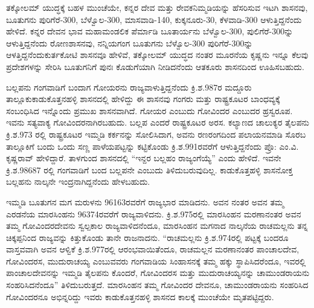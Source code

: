 ತಕ್ಕೋಲಮ್ ಯುದ್ಧಕ್ಕೆ ಬಹಳ ಮುಂಚೆಯೇ, ಕನ್ನರ ದೇವ ಮತ್ತು ರೇವಕನಿಮ್ಮಡಿಯನ್ನು ಹೆಸರಿಸುವ ಇಟಗಿ ಶಾಸನವು, ಬೂತುಗನು ಪುರಿಗೆರೆ-300, ಬೆಳ್ವೊಲ-300, ಮಾಸವಾಡಿ-140, ಕುಕ್ಕನೂರು-30, ಕೆಳವಾಡಿ-300 ಆಳುತ್ತಿದ್ದನೆಂದು ಹೇಳಿದೆ. ಕನ್ನರ ದೇವನ ಭಾವ ಮಹಾಮಂಡಲಿಕ ಪೆರ್ಮಾಡಿ ಬೂತಾರ್ಯನು ಬೆಳ್ವೊಲ-300, ಪುಲಿಗೆರೆ-300ನ್ನು ಆಳುತ್ತಿದ್ದನೆಂದು ರೋಣಶಾಸನವು, ನನ್ನಿಯಗಂಗ ಬೂತುಗನು ಬೆಳ್ವೊಲ-300 ಪುರಿಗೆರೆ-300ನ್ನು ಆಳತ್ತಿದ್ದನೆಂದು\break ಕುರ್ತಕೋಟಿ ಶಾಸನವೂ ಹೇಳಿವೆ, ತಕ್ಕೋಲಮ್ ಯುದ್ಧದ ನಂತರ ಮೂರನೆಯ ಕೃಷ್ಣನು ಇನ್ನೂ ಕೆಲವು ಪ್ರದೇಶಗಳನ್ನು ಸೇರಿಸಿ ಬೂತುಗನಿಗೆ ಪುನಃ ಕೊಡುಗೆಯಾಗಿ ನೀಡಿದನೆಂದು ಆತಕೂರು ಶಾಸನದಿಂದ ಊಹಿಸಬಹುದು.

ಬಲ್ಲಪನು ಗಂಗವಾಡಿಗೆ ಬಂದಾಗ ಗೋಯರನು ರಾಜ್ಯವಾಳುತ್ತಿದ್ದನೆಂದು ಕ್ರಿ.ಶ.987ರ ಮದ್ದೂರು ತಾಲ್ಲೂಕು\break ಕಾಡುಕೊತ್ತನಹಳ್ಳಿ ಶಾಸನದಲ್ಲಿ ಹೇಳಿದ್ದು ಈ ಶಾಸನವು ಗಂಗರು ಮತ್ತು ರಾಷ್ಟ್ರಕೂಟರ ಬಾಂಧವ್ಯಕ್ಕೆ ಸಂಬಂಧಿಸಿದ ಇನ್ನೊಂದು ಪ್ರಮುಖ ಶಾಸನವಾಗಿದೆ. ಗೋಯರ ಎಂಬುದು ಗೋವಿಂದರ ಎಂಬುದರ ಹ್ರಸ್ವರೂಪ. ಇವನು ಸತ್ಯವಾಕ್ಯ ಗೋವಿಂದರನಾಗಿರಬಹುದು. ಬಲ್ಲಪ ಎಂದರೆ ರಾಷ್ಟ್ರಕೂಟರ ಅರಸ. ಕಲ್ಯಾಣದ ಚಾಲುಕ್ಯರ ತೈಲಪನು ಕ್ರಿ.ಶ.973 ರಲ್ಲಿ ರಾಷ್ಟ್ರಕೂಟರ ಇಮ್ಮಡಿ ಕರ್ಕನನ್ನು ಸೋಲಿಸಿದಾಗ, ಅವನು ರಣರಂಗದಿಂದ ಪಲಾಯನಮಾಡಿ ಸೊರಬ ತಾಲ್ಲೂಕಿಗೆ ಬಂದು ಒಂದು ಸಣ್ಣ ಪಾಳೆಯಪಟ್ಟನ್ನು ಕಟ್ಟಿಕೊಂಡು ಕ್ರಿ.ಶ.991ರವರೆಗೆ ಆಳುತ್ತಿದ್ದನೆಂದು ಪ್ರೊ: ಎಂ.ವಿ. ಕೃಷ್ಣರಾವ್​ ಹೇಳಿದ್ದಾರೆ. ತಾಳಗುಂದ ಶಾಸನದಲ್ಲಿ “ಇನ್ದರ ಬಲ್ಲಹಂ ರಾಜ್ಯಂಗೆಯ್ಯೆ” ಎಂದು ಹೇಳಿದೆ. ಇವನೇ ಕ್ರಿ.ಶ.986\enginline{-}87 ರಲ್ಲಿ ಗಂಗವಾಡಿಗೆ ಬಂದ ಬಲ್ಲಪನೇ ಎಂಬುದು ತಿಳಿದುಬರುವುದಿಲ್ಲ. ಕಾಡುಕೊತ್ತಹಳ್ಳಿ ಶಾಸನೋಕ್ತ ಬಲ್ಲಹನು ನಾಲ್ಕನೇ ಇಂದ್ರನಾಗಿದ್ದನೆಂದು ಹೇಳಬಹುದು.

ಇಮ್ಮಡಿ ಬೂತುಗನ ಮಗ ಮರುಳನು 961\enginline{-}63ರವರೆಗೆ ರಾಜ್ಯಭಾರ ಮಾಡಿದನು. ಅವನ ನಂತರ ಅವನ ತಮ್ಮ ಎರಡನೆಯ ಮಾರಸಿಂಹನು 963\enginline{-}74ರವರೆಗೆ ರಾಜ್ಯವಾಳಿದನು. ಕ್ರಿ.ಶ.975ರಲ್ಲಿ ಮಾರಸಿಂಹನ ಮರಣಾನಂತರ ಅವನ ತಮ್ಮ ಗೋವಿಂದರದೇವನು ಸ್ವಲ್ಪಕಾಲ ರಾಜ್ಯವಾಳಿದನೆಂದೂ, ಮಾರಸಿಂಹನ ಮಗನಾದ ನಾಲ್ಕನೆಯ ರಾಚಮಲ್ಲನು ತನ್ನ ಚಿಕ್ಕಪ್ಪನಿಂದ ರಾಜ್ಯವನ್ನು ಕಿತ್ತುಕೊಂಡು ತಾನೇ ರಾಜನಾದನು. “ರಾಚಮಲ್ಲನು ಕ್ರಿ.ಶ.974ರಲ್ಲಿ ಪಟ್ಟಕ್ಕೆ ಬಂದರೂ ವಾಸ್ತವವಾಗಿ ಅವನ ಆಳ್ವಿಕೆ ಕ್ರಿ.ಶ.977ರಲ್ಲಿ ಆರಂಭವಾಯಿತೆಂದೂ, ರಾಚಮಲ್ಲನ ಮರಣಾನಂತರ ಪಾಂಚಾಲದೇವ, ಗೋವಿಂದರಸ, ಮುದುರಾಚಯ್ಯ ಎಂಬುವವರು ಗಂಗವಾಡಿಯ ಸಿಂಹಾಸನಕ್ಕೆ ತಮ್ಮ ಹಕ್ಕು ಸ್ಥಾಪಿಸಿದರೆಂದೂ, ಇವರಲ್ಲಿ ಪಾಂಚಾಲದೇವನನ್ನು ಇಮ್ಮಡಿ ತೈಲಪನು ಕೊಂದರೆ, ಗೋವಿಂದರಸ ಮತ್ತು ಮುದುರಾಚಯ್ಯನನ್ನು ಚಾಮುಂಡರಾಯನು ಸಂಹರಿಸಿದನೆಂದೂ” ತಿಳಿದುಬರುತ್ತದೆ. ಮಾರಸಿಂಹನ ತಮ್ಮ ಗೋವಿಂದರ ದೇವನೂ, ಚಾಮುಂಡರಾಯನು ಸಂಹರಿಸಿದ ಗೋವಿಂದರನೂ ಅಭಿನ್ನರಿದ್ದು ಇವರು ಕಾಡುಕೊತ್ತನಹಳ್ಳಿ ಶಾಸನದ ಕಾಲಕ್ಕೆ ಮುಂಚೆಯೇ ಮೃತಪಟ್ಟಿದ್ದರು.


